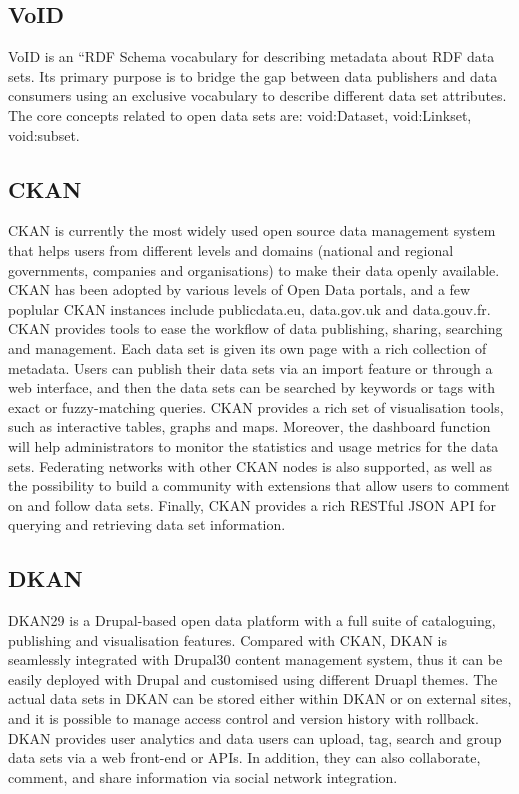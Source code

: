 \documentclass[runningheads,a4paper]{llncs}
\begin{document}
\subsection{VoID}

VoID is an “RDF Schema vocabulary for describing metadata about RDF data sets. Its primary purpose is to bridge the gap between data publishers and data consumers using an exclusive vocabulary to describe different data set attributes. The core concepts related to open data sets are: void:Dataset, void:Linkset, void:subset.

\subsection{CKAN}

CKAN is currently the most widely used open source data management system that helps users from different levels and domains (national and regional governments, companies and organisations) to make their data openly available. CKAN has been adopted by various levels of Open Data portals, and a few poplular CKAN instances include publicdata.eu, data.gov.uk and data.gouv.fr. CKAN provides tools to ease the workflow of data publishing, sharing, searching and management. Each data set is given its own page with a rich collection of metadata. Users can publish their data sets via an import feature or through a web interface, and then the data sets can be searched by keywords or tags with exact or fuzzy-matching queries. CKAN provides a rich set of visualisation tools, such as interactive tables, graphs and maps. Moreover, the dashboard function will help administrators to monitor the statistics and usage metrics for the data sets. Federating networks with other CKAN nodes is also supported, as well as the possibility to build a community with extensions that allow users to comment on and follow data sets. Finally, CKAN provides a rich RESTful JSON API for querying and retrieving data set information.

\subsection{DKAN}

DKAN29 is a Drupal-based open data platform with a full suite of cataloguing, publishing and visualisation features. Compared with CKAN, DKAN is seamlessly integrated with Drupal30 content management system, thus it can be easily deployed with Drupal and customised using different Druapl themes. The actual data sets in DKAN can be stored either within DKAN or on external sites, and it is possible to manage access control and version history with rollback. DKAN provides user analytics and data users can upload, tag, search and group data sets via a web front-end or APIs. In addition, they can also collaborate, comment, and share information via social network integration.
\end{document}
